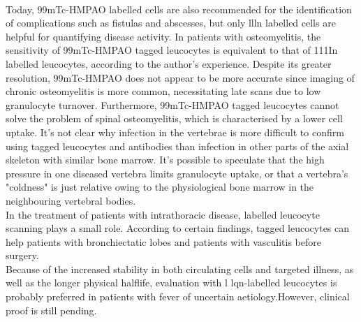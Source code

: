 \documentclass[12pt]{article}
\begin{document}
\\Today, 99mTc-HMPAO labelled cells are also recommended for the identification of complications such as fistulas and abscesses, but only llln labelled cells are helpful for quantifying disease activity. In patients with osteomyelitis, the sensitivity of 99mTc-HMPAO tagged leucocytes is equivalent to that of 111In labelled leucocytes, according to the author's experience. Despite its greater resolution, 99mTc-HMPAO does not appear to be more accurate since imaging of chronic osteomyelitis is more common, necessitating late scans due to low granulocyte turnover. Furthermore, 99mTc-HMPAO tagged leucocytes cannot solve the problem of spinal osteomyelitis, which is characterised by a lower cell uptake. It's not clear why infection in the vertebrae is more difficult to confirm using tagged leucocytes and antibodies than infection in other parts of the axial skeleton with similar bone marrow. It's possible to speculate that the high pressure in one diseased vertebra limits granulocyte uptake, or that a vertebra's "coldness" is just relative owing to the physiological bone marrow in the neighbouring vertebral bodies.
\\In the treatment of patients with intrathoracic disease, labelled leucocyte scanning plays a small role. According to certain findings, tagged leucocytes can help patients with bronchiectatic lobes and patients with vasculitis before surgery.
\\Because of the increased stability in both circulating cells and targeted illness, as well as the longer physical halflife, evaluation with l lqn-labelled leucocytes is probably preferred in patients with fever of uncertain aetiology.However, clinical proof is still pending.
\end{document}
